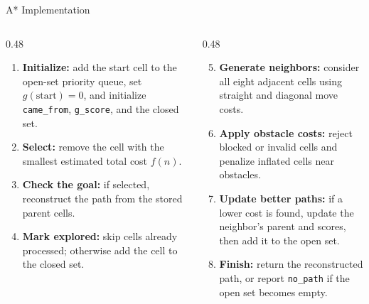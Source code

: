 \documentclass[aspectratio=169, 11pt]{beamer}
\begin{document}
\begin{frame}{A* Implementation}
  \small
  \begin{columns}[T]
    \begin{column}{0.48\textwidth}
      \begin{enumerate}
        \item \textbf{Initialize:} add the start cell to the open-set priority queue, set $g(\text{start})=0$, and initialize \texttt{came\_from}, \texttt{g\_score}, and the closed set.
        \item \textbf{Select:} remove the cell with the smallest estimated total cost $f(n)$.
        \item \textbf{Check the goal:} if selected, reconstruct the path from the stored parent cells.
        \item \textbf{Mark explored:} skip cells already processed; otherwise add the cell to the closed set.
      \end{enumerate}
    \end{column}

    \begin{column}{0.48\textwidth}
      \begin{enumerate}
        \setcounter{enumi}{4}
        \item \textbf{Generate neighbors:} consider all eight adjacent cells using straight and diagonal move costs.
        \item \textbf{Apply obstacle costs:} reject blocked or invalid cells and penalize inflated cells near obstacles.
        \item \textbf{Update better paths:} if a lower cost is found, update the neighbor's parent and scores, then add it to the open set.
        \item \textbf{Finish:} return the reconstructed path, or report \texttt{no\_path} if the open set becomes empty.
      \end{enumerate}
    \end{column}
  \end{columns}
\end{frame}
\end{document}
